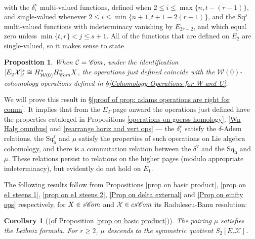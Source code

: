 \documentclass[11pt]{amsart} \renewcommand{\baselinestretch}{1.2}
\theoremstyle{plain}
\newtheorem{prop}[thm]{Proposition}
\newtheorem{cor}[thm]{Corollary}
\numberwithin{equation}{section} %
\theoremstyle{plain}
\newtheorem{prop}[thm]{Proposition}
\newtheorem{cor}[thm]{Corollary}
\numberwithin{equation}{chapter} %
\newcommand{\scrC}{\mathscr{C}}
\newcommand{\calw}{\mathcal{W}}
\newcommand{\calx}{\mathcal{X}}
\newcommand{\calc}{\mathcal{C}}
\newcommand{\Sq}{\mathrm{Sq}}
\newcommand{\algs}{{\scrC\!\textit{\normalfont\textit{om}}}}
\newcommand{\E}[5]{[E^{#1}_{#2}#3]^{#4}_{#5}}
\newcommand{\Edownup}[5]{[E_{#1}^{#2}#3]^{#4}_{#5}}
\newcommand{\uver}{^\mathrm{v}}
\newcommand{\dhor}{_\mathrm{h}}
\newcommand{\Sqh}{\mathrm{Sq}\dhor}
\newcommand{\deltav}{\delta\uver}
\begin{document}
\begin{Operations on the Bousfield-Kan spectral sequence}
\begin{gather*}
\end{gather*}
with the $\deltav_i$  multi-valued functions,  defined when $2\leq i\leq \max\{n,t-(r-1)\}$, and single-valued whenever $2\leq i\leq\min\{n+1,t+1-2(r-1)\}$, and the $\Sq^j$  multi-valued functions with indeterminacy vanishing by $E_{2r-2}$, and which equal zero unless $\min\{t,r\}< j\leq s+1$.  All of the functions that are  defined on $E_2$ are single-valued, so it makes sense to state 
\begin{prop}
\label{adams operations are right for comm}
When $\calc=\algs$,
under the identification $\E{}{2}{\calx}{s}{t}\cong H^*_{\calw(0)}H^*_{\algs}X$, the operations just defined coincide with the  ${\calw(0)}$-cohomology operations defined in \S\ref{Cohomology Operations for W and U}.
\end{prop}
\noindent We will prove this result in \S\ref{proof of prop: adams operations are right for comm}. It implies that from the $E_2$-page onward the operations just defined have the properties cataloged in Propositions \ref{operations on goerss homology}, \ref{Wn Halg omnibus} and \ref{rearrange horiz and vert ops} --- the $\deltav_i$ satisfy the $\delta$-Adem relations, the $\Sqh^j$ and $\mu$ satisfy the properties of such operations on Lie algebra cohomology, and there is a commutation relation between the $\deltav$ and the $\Sqh$ and $\mu$. These relations persist to relations on the higher pages (modulo appropriate indeterminacy), but evidently do not hold on $E_1$.


The following results follow from Propositions \ref{prop on basic product}, \ref{prop on e1 steens 1}, \ref{prop on e1 steens 2}, \ref{Prop on delta external} and \ref{Prop on einfty ops} respectively, for $X\in s\algs$ and $\calx\in cs\algs$ its Radulescu-Banu resolution:
\begin{cor}[(of Proposition \ref{prop on basic product})]
\label{prop on basic product composed with lift}
The pairing $\mu$ satisfies the Leibniz formula. For $r\geq2$, $\mu$ descends to the symmetric quotient $S_2\Edownup{r}{}{\calx}{}{}$.
\end{cor}



\end{Operations on the Bousfield-Kan spectral sequence}
\end{document}
